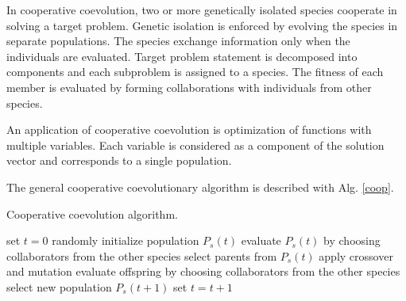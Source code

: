 In cooperative coevolution, two or more genetically isolated species cooperate in solving a target problem. 
Genetic isolation is enforced by evolving the species in separate populations. 
The species exchange information only when the individuals are evaluated. 
Target problem statement is decomposed into components and each subproblem is assigned to a species. 
The fitness of each member is evaluated by forming collaborations with individuals from other species. 

An application of cooperative coevolution is optimization of functions with multiple variables. 
Each variable is considered as a component of the solution vector and corresponds to a single population. 

The general cooperative coevolutionary algorithm is described with Alg. \ref{coop}.

\begin{algorithm}
\caption{Cooperative coevolution algorithm.\label{coop}}
\begin{algorithmic}[1]
\State set $t=0$
\State randomly initialize population $P_s(t)$
\EndFor
{}
\State evaluate $P_s(t)$ by choosing collaborators from the other species
\EndFor
{}
\State select parents from $P_s(t)$
\State apply crossover and mutation
\State evaluate offspring by choosing collaborators from the other species
\State select new population $P_s(t+1)$
\EndFor
\State set $t=t+1$
\EndWhile
\end{algorithmic}
\end{algorithm}

